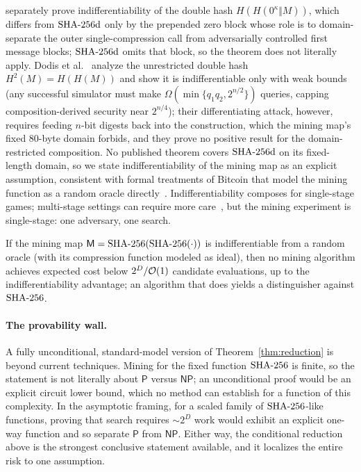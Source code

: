 \documentclass[11pt]{article}
\begin{document}
separately prove indifferentiability of the double hash
$H(H(0^{\kappa}\Vert M))$, which differs from $\mathrm{SHA\text{-}256d}$ only by the
prepended zero block whose role is to domain-separate the outer
single-compression call from adversarially controlled first message
blocks; $\mathrm{SHA\text{-}256d}$ omits that block, so the theorem does not literally
apply. Dodis et al.~\cite{drst} analyze the unrestricted double hash
$H^{2}(M)=H(H(M))$ and show it is indifferentiable only with weak
bounds (any successful simulator must make
$\Omega(\min\{q_{1}q_{2},2^{n/2}\})$ queries, capping
composition-derived security near $2^{n/4}$); their differentiating
attack, however, requires feeding $n$-bit digests back into the
construction, which the mining map's fixed 80-byte domain forbids, and
they prove no positive result for the domain-restricted composition.
No published theorem covers $\mathrm{SHA\text{-}256d}$ on its fixed-length domain, so we
state indifferentiability of the mining map as an explicit assumption,
consistent with formal treatments of Bitcoin that model the mining
function as a random oracle directly~\cite{backbone}.
Indifferentiability composes for single-stage games;
multi-stage settings can require more care~\cite{rss}, but the mining
experiment is single-stage: one adversary, one search.

\begin{theorem}\label{thm:reduction}
If the mining map $\mathsf{M}=\mathrm{SHA\text{-}256}(\mathrm{SHA\text{-}256}(\cdot))$ is indifferentiable from a
random oracle (with its compression function modeled as ideal), then no
mining algorithm achieves expected cost below $2^{D}/\mathcal{O}(1)$ candidate
evaluations, up to the indifferentiability advantage; an algorithm that
does yields a distinguisher against $\mathrm{SHA\text{-}256}$.
\end{theorem}

\paragraph{The provability wall.}
A fully unconditional, standard-model version of
Theorem~\ref{thm:reduction} is beyond current techniques. Mining for the
fixed function $\mathrm{SHA\text{-}256}$ is finite, so the statement is not literally about
$\mathsf{P}$ versus $\mathsf{NP}$; an unconditional proof would be an
explicit circuit lower bound, which no method can establish for a
function of this complexity. In the asymptotic framing, for a scaled
family of $\mathrm{SHA\text{-}256}$-like functions, proving that search requires
$\sim 2^{D}$ work would exhibit an explicit one-way function and so
separate $\mathsf{P}$ from $\mathsf{NP}$. Either way, the conditional
reduction above is the strongest conclusive statement available, and it
localizes the entire risk to one assumption.
\end{document}
